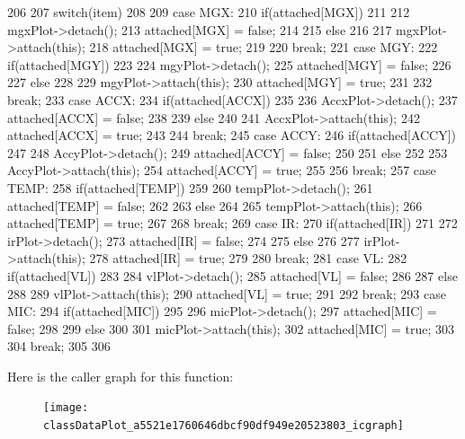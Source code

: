 \begin{DoxyCode}
206 {
207     switch(item)
208     {
209     case MGX:
210         if(attached[MGX])
211         {
212             mgxPlot->detach();
213             attached[MGX] = false;
214         }
215         else
216         {
217             mgxPlot->attach(this);
218             attached[MGX] = true;
219         }
220         break;
221     case MGY:
222         if(attached[MGY])
223         {
224             mgyPlot->detach();
225             attached[MGY] = false;
226         }
227         else
228         {
229             mgyPlot->attach(this);
230             attached[MGY] = true;
231         }
232         break;
233     case ACCX:
234         if(attached[ACCX])
235         {
236             AccxPlot->detach();
237             attached[ACCX] = false;
238         }
239         else
240         {
241             AccxPlot->attach(this);
242             attached[ACCX] = true;
243         }
244         break;
245     case ACCY:
246         if(attached[ACCY])
247         {
248             AccyPlot->detach();
249             attached[ACCY] = false;
250         }
251         else
252         {
253             AccyPlot->attach(this);
254             attached[ACCY] = true;
255         }
256         break;
257     case TEMP:
258         if(attached[TEMP])
259         {
260             tempPlot->detach();
261             attached[TEMP] = false;
262         }
263         else
264         {
265             tempPlot->attach(this);
266             attached[TEMP] = true;
267         }
268         break;
269     case IR:
270         if(attached[IR])
271         {
272             irPlot->detach();
273             attached[IR] = false;
274         }
275         else
276         {
277             irPlot->attach(this);
278             attached[IR] = true;
279         }
280         break;
281     case VL:
282         if(attached[VL])
283         {
284             vlPlot->detach();
285             attached[VL] = false;
286         }
287         else
288         {
289             vlPlot->attach(this);
290             attached[VL] = true;
291         }
292         break;
293     case MIC:
294         if(attached[MIC])
295         {
296             micPlot->detach();
297             attached[MIC] = false;
298         }
299         else
300         {
301             micPlot->attach(this);
302             attached[MIC] = true;
303         }
304         break;
305     }
306 }
\end{DoxyCode}




Here is the caller graph for this function:\nopagebreak
\begin{figure}[H]
\begin{center}
\leavevmode
\texttt{[image: classDataPlot\_a5521e1760646dbcf90df949e20523803\_icgraph]}
\end{center}
\end{figure}


